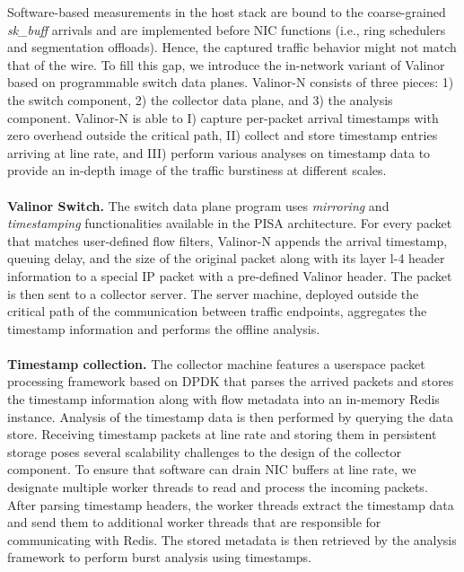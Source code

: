 Software-based measurements in the host stack are bound to the coarse-grained \textit{sk\_buff} arrivals and are implemented before NIC functions (i.e., ring schedulers and segmentation offloads). Hence, the captured traffic behavior might not match that of the wire. To fill this gap, we introduce the in-network variant of Valinor based on programmable switch data planes.
Valinor-N consists of three pieces: 1) the switch component, 2) the collector data plane, and 3) the analysis component. Valinor-N is able to I) capture per-packet arrival timestamps with zero overhead outside the critical path, II) collect and store timestamp entries arriving at line rate, and III) perform various analyses on timestamp data to provide an in-depth image of the traffic burstiness at different scales. 
\\
\\
\textbf{Valinor Switch.} The switch data plane program uses \textit{mirroring} and \textit{timestamping} functionalities available in the PISA architecture. For every packet that matches user-defined flow filters, Valinor-N appends the arrival timestamp, queuing delay, and the size of the original packet along with its layer l-4 header information to a special IP packet with a pre-defined Valinor header. The packet is then sent to a collector server. The server machine, deployed outside the critical path of the communication between traffic endpoints, aggregates the timestamp information and performs the offline analysis.
\\
\\
\textbf{Timestamp collection.} The collector machine features a userspace packet processing framework based on DPDK that parses the arrived packets and stores the timestamp information along with flow metadata into an in-memory Redis \cite{redis} instance. Analysis of the timestamp data is then performed by querying the data store.
Receiving timestamp packets at line rate and storing them in persistent storage poses several scalability challenges to the design of the collector component. 
To ensure that software can drain NIC buffers at line rate, we designate multiple worker threads to read and process the incoming packets. After parsing timestamp headers, the worker threads extract the timestamp data and send them to additional worker threads that are responsible for communicating with Redis. The stored metadata is then retrieved by the analysis framework to perform  burst analysis using timestamps.

